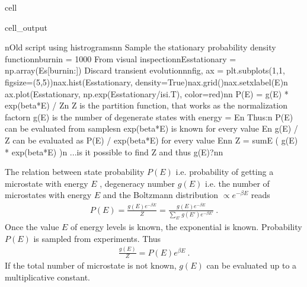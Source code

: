\documentclass[letterpaper,10pt,english]{jupyterBook}
\begin{document}
\begin{sphinxuseclass}{cell}
\begin{sphinxVerbatimOutput}
\begin{sphinxuseclass}{cell_output}
\begin{sphinxVerbatim}[commandchars=\\\{\}]
\PYGZdq{}\PYGZbs{}nOld script using histrograms\PYGZbs{}n\PYGZbs{}n\PYGZsh{}\PYGZgt{} Sample the stationary probability density function\PYGZbs{}nburn\PYGZus{}in = 1000                           \PYGZsh{} From visual inspection\PYGZbs{}nEs\PYGZus{}stationary = np.array(Es[burn\PYGZus{}in:])   \PYGZsh{} Discard transient evolution\PYGZbs{}n\PYGZbs{}nfig, ax = plt.subplots(1,1, figsize=(5,5))\PYGZbs{}nax.hist(Es\PYGZus{}stationary, density=True)\PYGZbs{}nax.grid()\PYGZbs{}nax.set\PYGZus{}xlabel(\PYGZsq{}E\PYGZsq{})\PYGZbs{}n\PYGZsh{} ax.plot(Es\PYGZus{}stationary, np.exp(Es\PYGZus{}stationary/isi.T), color=\PYGZsq{}red\PYGZsq{})\PYGZbs{}n\PYGZbs{}n\PYGZsh{} P(E) = g(E) * exp(\PYGZhy{}beta*E) / Z\PYGZbs{}n\PYGZsh{} Z is the partition function, that works as the normalization factor\PYGZbs{}n\PYGZsh{} g(E) is the number of degenerate states with energy = E\PYGZbs{}n\PYGZsh{} Thus:\PYGZbs{}n\PYGZsh{} \PYGZhy{} P(E) can be evaluated from samples\PYGZbs{}n\PYGZsh{} \PYGZhy{} exp(\PYGZhy{}beta*E) is known for every value E\PYGZbs{}n\PYGZsh{} \PYGZhy{} g(E) / Z can be evaluated as P(E) / exp(\PYGZhy{}beta*E) for every value E\PYGZbs{}n\PYGZsh{}\PYGZbs{}n\PYGZsh{} Z = sum\PYGZus{}E ( g(E) * exp(\PYGZhy{}beta*E) )\PYGZbs{}n\PYGZsh{} ...is it possible to find Z and thus g(E)?\PYGZbs{}n\PYGZbs{}n\PYGZdq{}
\end{sphinxVerbatim}

\end{sphinxuseclass}\end{sphinxVerbatimOutput}

\end{sphinxuseclass}
\sphinxAtStartPar
The relation between state probability \(P(E)\) \sphinxhyphen{} i.e. probability of getting a microstate with energy \(E\) \sphinxhyphen{}, degeneracy number \(g(E)\) \sphinxhyphen{} i.e. the number of microstates with energy \(E\) \sphinxhyphen{} and the Boltzmann distribution \(\propto e^{-\beta E}\) reads
\begin{equation*}
\begin{split}P(E) = \frac{g(E) e^{-\beta E}}{Z} = \frac{g(E) e^{-\beta E}}{\sum_{E'} g(E') e^{-\beta E'}} \ .\end{split}
\end{equation*}
\sphinxAtStartPar
Once the value \(E\) of energy levels is known, the exponential is known. Probability \(P(E)\) is sampled from experiments. Thus
\begin{equation*}
\begin{split}\frac{g(E)}{Z} = P(E) e^{\beta E} \ .\end{split}
\end{equation*}
\sphinxAtStartPar
If the total number of microstate is not known, \(g(E)\) can be evaluated up to a multiplicative constant.
\end{document}
